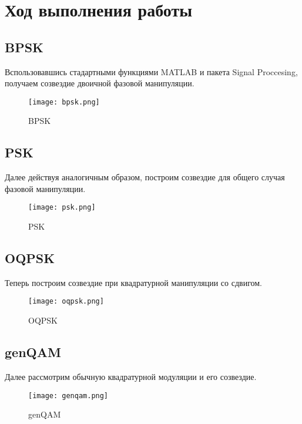 \section{Ход выполнения работы}
\subsection{BPSK}
Вспользовавшись стадартными функциями MATLAB и пакета Signal Proccesing, получаем созвездие 
двоичной фазовой манипуляции.

\begin{figure}[H]
	\begin{center}
		\texttt{[image: bpsk.png]}
		\caption{BPSK} 
		\label{pic:bpsk} %
	\end{center}
\end{figure} 

\subsection{PSK}
Далее действуя аналогичным образом, построим созвездие для общего случая фазовой манипуляции. 

\begin{figure}[H]
	\begin{center}
		\texttt{[image: psk.png]}
		\caption{PSK} 
		\label{pic:psk} %
	\end{center}
\end{figure} 

\subsection{OQPSK}

Теперь построим созвездие при квадратурной манипуляции со сдвигом.
\begin{figure}[H]
	\begin{center}
		\texttt{[image: oqpsk.png]}
		\caption{OQPSK} 
		\label{pic:oqpsk} %
	\end{center}
\end{figure} 

\subsection{genQAM}
Далее рассмотрим обычную квадратурной модуляции и его созвездие.
\begin{figure}[H]
	\begin{center}
		\texttt{[image: genqam.png]}
		\caption{genQAM} 
		\label{pic:genqam} %
	\end{center}
\end{figure} 

